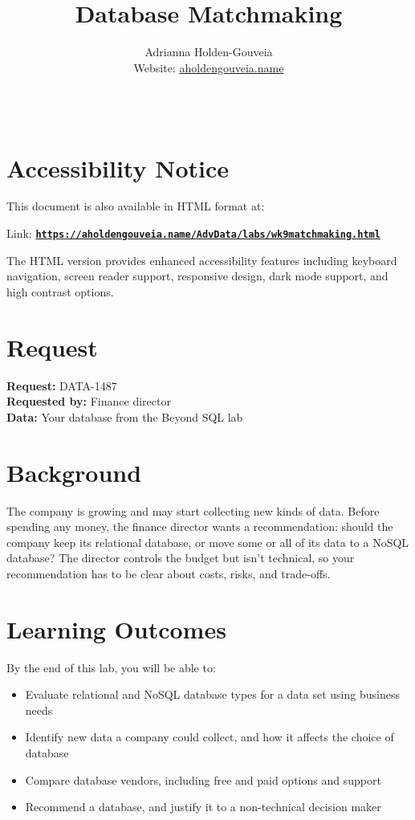 \documentclass[12pt]{article}
\title{Database Matchmaking}
\author{
        Adrianna Holden-Gouveia \\
        Website: \href{https://aholdengouveia.name}{aholdengouveia.name}\\ 
        \date{\vspace{-5ex}}
        \faGithub {: aholdengouveia} \\
        }
\begin{document}
    

\maketitle



\section*{Accessibility Notice}
This document is also available in HTML format at:

Link: \href{https://aholdengouveia.name/AdvData/labs/wk9matchmaking.html}{\textbf{\nolinkurl{https://aholdengouveia.name/AdvData/labs/wk9matchmaking.html}}}

The HTML version provides enhanced accessibility features including keyboard navigation, screen reader support, responsive design, dark mode support, and high contrast options.

\section*{Request}
\noindent\textbf{Request:} DATA-1487\\
\textbf{Requested by:} Finance director\\
\textbf{Data:} Your database from the Beyond SQL lab

\section*{Background}
The company is growing and may start collecting new kinds of data. Before spending any money, the finance director wants a recommendation: should the company keep its relational database, or move some or all of its data to a NoSQL database? The director controls the budget but isn't technical, so your recommendation has to be clear about costs, risks, and trade-offs.

\section*{Learning Outcomes}
By the end of this lab, you will be able to:
\begin{itemize}
    \item Evaluate relational and NoSQL database types for a data set using business needs
    \item Identify new data a company could collect, and how it affects the choice of database
    \item Compare database vendors, including free and paid options and support
    \item Recommend a database, and justify it to a non-technical decision maker
\end{itemize}
\end{document}
